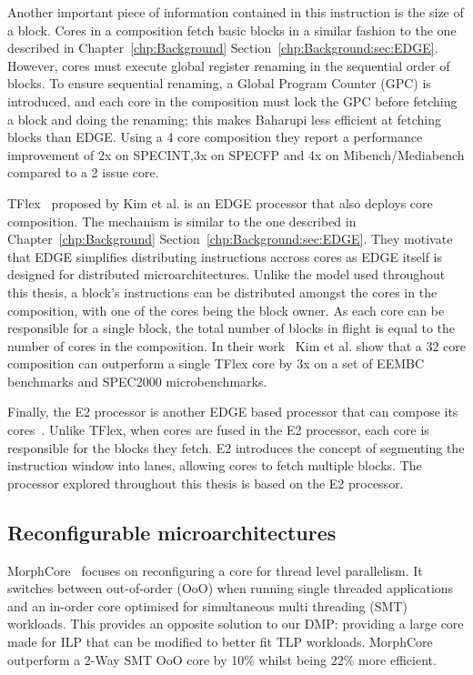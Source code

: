 Another important piece of information contained in this instruction is the size of a block.
Cores in a composition fetch basic blocks in a similar fashion to the one described in Chapter~\ref{chp:Background} Section~\ref{chp:Background:sec:EDGE}.
However, cores must execute global register renaming in the sequential order of blocks.
To ensure sequential renaming, a Global Program Counter (GPC) is introduced, and each core in the composition must lock the GPC before fetching a block and doing the renaming; this makes Baharupi less efficient at fetching blocks than EDGE.
Using a 4 core composition they report a performance improvement of 2x on SPECINT,3x on SPECFP and 4x on Mibench/Mediabench compared to a 2 issue core. 

TFlex~\cite{kim2007tflex} proposed by Kim et al. is an EDGE processor that also deploys core composition.
The mechanism is similar to the one described in Chapter~\ref{chp:Background} Section~\ref{chp:Background:sec:EDGE}.
They motivate that EDGE simplifies distributing instructions accross cores as EDGE itself is designed for distributed microarchitectures.
Unlike the model used throughout this thesis, a block's instructions can be distributed amongst the cores in the composition, with one of the cores being the block owner.
As each core can be responsible for a single block, the total number of blocks in flight is equal to the number of cores in the composition.
In their work~\cite{kim2007tflex} Kim et al. show that a 32 core composition can outperform a single TFlex core by 3x on a set of EEMBC benchmarks and SPEC2000 microbenchmarks.

Finally, the E2 processor is another EDGE based processor that can compose its cores~\cite{putnam2010e2}.
Unlike TFlex, when cores are fused in the E2 processor, each core is responsible for the blocks they fetch.
E2 introduces the concept of segmenting the instruction window into lanes, allowing cores to fetch multiple blocks.
The processor explored throughout this thesis is based on the E2 processor.

\subsection{Reconfigurable microarchitectures}

MorphCore~\cite{khubaibMorphCore2012} focuses on reconfiguring a core for thread level parallelism.
It switches between out-of-order (OoO) when running single threaded applications and an in-order core optimised for simultaneous multi threading (SMT) workloads.
This provides an opposite solution to our DMP: providing a large core made for ILP that can be modified to better fit TLP workloads.
MorphCore outperform a 2-Way SMT OoO core by 10\% whilst being 22\% more efficient.

